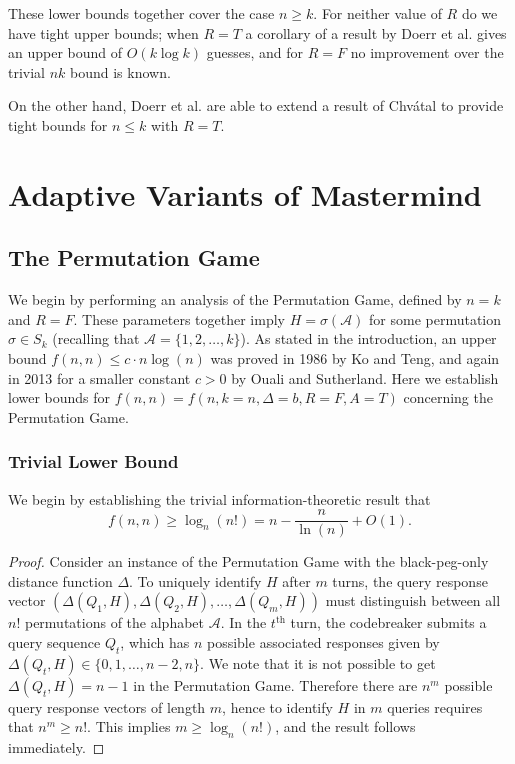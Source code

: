 \documentclass[12pt, a4paper]{article}
\newcommand{\nth}{^{\text{th}}}       %
\begin{document}
These lower bounds together cover the case $n \geq k$. For neither value of $R$ do we have tight upper bounds; when $R = T$ a corollary of a result by Doerr et al. \cite{DS13} gives an upper bound of $O(k \log k)$ guesses, and for $R = F$ no improvement over the trivial $nk$ bound is known.

On the other hand, Doerr et al. are able to extend a result of Chv\'atal to provide tight bounds for $n \le k$ with $R = T$. 

\section{Adaptive Variants of Mastermind}
\subsection{The Permutation Game}
We begin by performing an analysis of the Permutation Game, defined by $n=k$ and $R=F$. These parameters together imply $H=\sigma(\mathcal{A})$ for some permutation $\sigma\in S_k$ (recalling that $\mathcal{A}=\{1,2,\ldots, k\}$). As stated in the introduction, an upper bound $f(n, n)\le c\cdot n\log(n)$ was proved in 1986 by Ko and Teng, and again in 2013 for a smaller constant $c>0$ by Ouali and Sutherland. Here we establish lower bounds for $f(n, n) = f(n, k=n, \Delta=b, R=F, A=T)$ concerning the Permutation Game.

	\subsubsection{Trivial Lower Bound}
	We begin by establishing the trivial information-theoretic result that
	\begin{equation*}
		f(n, n)\ge \log_{n}(n!) = n-\frac{n}{\ln(n)}+O(1).
	\end{equation*}
	\begin{proof}
		Consider an instance of the Permutation Game with the black-peg-only distance function $\Delta$. To uniquely identify $H$ after $m$ turns, the query response vector $(\Delta(Q_1, H), \Delta(Q_2, H), \ldots, \Delta(Q_m, H))$ must distinguish between all $n!$ permutations of the alphabet $\mathcal{A}$. In the $t\nth$ turn, the codebreaker submits a query sequence $Q_t$, which has $n$ possible associated responses given by $\Delta(Q_t, H)\in\{0, 1, \ldots, n-2, n\}$. We note that it is not possible to get $\Delta(Q_t, H)=n-1$ in the Permutation Game. Therefore there are $n^m$ possible query response vectors of length $m$, hence to identify $H$ in $m$ queries requires that $n^m\ge n!$. This implies $m\ge\log_n(n!)$, and the result follows immediately.
	\end{proof}
\end{document}
